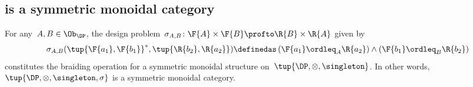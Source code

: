 \subsection{\DP is a symmetric monoidal category}
\begin{lemma}
  \label{lem:symmetricmonoidaldp}
  For any~$A,B \in\Ob_\DP$, the design problem~$\sigma_{A,B}\colon \F{A} \times \F{B} \profto \R{B} \times \R{A}$ given by
  \begin{equation}
    \sigma_{A,B}(\tup{\F{a_1},\F{b_1}}^*,\tup{\R{b_2},\R{a_2}})\definedas \left(\F{a_1}\ordleq_A \R{a_2}\right)\wedge \left(\F{b_1}\ordleq_B \R{b_2}\right)
  \end{equation}
  constitutes the braiding operation for a symmetric monoidal structure on~$\tup{\DP,\otimes,\singleton}$. In other words,~$\tup{\DP, \otimes, \singleton, \sigma}$ is a symmetric monoidal category.
\end{lemma}

